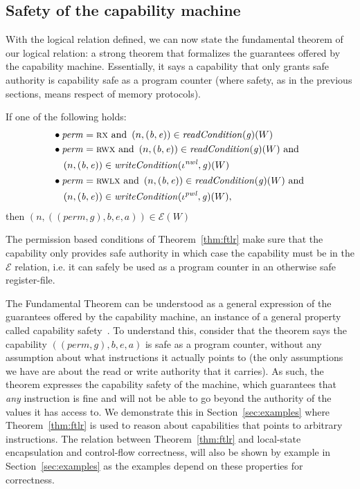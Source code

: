 \documentclass[acmsmall,review]{acmart}\settopmatter{printfolios=true}
\newcommand{\var}[1]{\mathit{#1}}
\newcommand{\gl}{\var{g}}
\newcommand{\addr}{\var{a}}
\newcommand{\start}{\var{b}}
\newcommand{\addrend}{\var{e}}
\newcommand{\perm}{\var{perm}}
\newcommand{\nwl}{\var{nwl}}
\newcommand{\pwl}{\var{pwl}}
\newcommand{\plainfun}[2]{
  \ifthenelse{\equal{#2}{}}
  {\mathit{#1}}
  {\mathit{#1}(#2)}
}
\newcommand{\readCond}[1]{\plainfun{readCondition}{#1}}
\newcommand{\writeCond}[1]{\plainfun{writeCondition}{#1}}
\newcommand{\asmType}{\plaindom{AsmType}}
\newcommand{\plaindom}[1]{\mathrm{#1}}
\newcommand{\intr}[2]{\mathcal{#1}}
\newcommand{\exprintr}[1]{\intr{E}{#1}}
\newcommand{\stder}{\exprintr{\asmType}}
\newcommand{\npair}[2][n]{\left(#1,#2 \right)}
\newcommand{\plainperm}[1]{\textsc{#1}}
\newcommand{\exec}{\plainperm{rx}}
\newcommand{\rwx}{\plainperm{rwx}}
\newcommand{\rwlx}{\plainperm{rwlx}}
\begin{document}
\subsection{Safety of the capability machine}
With the logical relation defined, we can now state the fundamental theorem of
our logical relation: a strong theorem that formalizes the guarantees offered by
the capability machine. Essentially, it says a capability that only grants safe
authority is capability safe as a program counter (where safety, as in the
previous sections, means respect of memory protocols).
\begin{theorem}
  \label{thm:ftlr}
  If one of the following holds:
  \begin{align*}
      & \bullet
        \begin{aligned}[t]
        &\perm = \exec \text{ and }\npair{(\start,\addrend)} \in \readCond{}(\gl)(W)
      \end{aligned} \\
    & \bullet 
      \begin{aligned}[t]
        &\perm = \rwx \text{ and } \npair{(\start,\addrend)} \in \readCond{}(\gl)(W) \text{ and }\\
        &\npair{(\start,\addrend)} \in \writeCond{}(\iota^\nwl,\gl)(W)
      \end{aligned} \\
    & \bullet 
      \begin{aligned}[t]
        &\perm = \rwlx \text{ and }\npair{(\start,\addrend)} \in \readCond{}(\gl)(W) \text{ and }\\
        &\npair{(\start,\addrend)} \in \writeCond{}(\iota^\pwl,\gl)(W),
      \end{aligned}
  \end{align*}
  then $\npair{((\perm,\gl),\start,\addrend,\addr)} \in \stder(W)$
\end{theorem}
The permission based conditions of Theorem~\ref{thm:ftlr} make sure that the
capability only provides safe authority in which case the capability must be in
the $\stder$ relation, i.e. it can safely be used as a program counter in an
otherwise safe register-file.

The Fundamental Theorem can be understood as a general expression of the
guarantees offered by the capability machine, an instance of a general property
called capability safety~\citep{Devriese:2016ObjCap,Maffeis2010OC}. To
understand this, consider that the theorem says the capability
$((\perm,\gl),\start,\addrend,\addr)$ is safe as a program counter, without any
assumption about what instructions it actually points to (the only assumptions
we have are about the read or write authority that it carries). As such, the
theorem expresses the capability safety of the machine, which guarantees that
\emph{any} instruction is fine and will not be able to go beyond the authority
of the values it has access to. We demonstrate this in
Section~\ref{sec:examples} where Theorem~\ref{thm:ftlr} is used to reason about
capabilities that points to arbitrary instructions. The relation between
Theorem~\ref{thm:ftlr} and local-state encapsulation and control-flow
correctness, will also be shown by example in Section~\ref{sec:examples} as the
examples depend on these properties for correctness.
\end{document}
